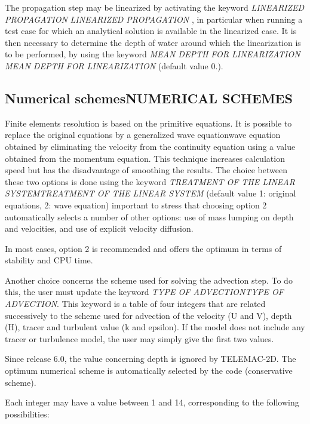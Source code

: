 \documentclass{article} %
\begin{document}
 The propagation step may be linearized by activating the keyword \textit{LINEARIZED PROPAGATION} \textit{LINEARIZED PROPAGATION }, in particular when running a test case for which an analytical solution is available in the linearized case. It is then necessary to determine the depth of water around which the linearization is to be performed, by using the keyword \textit{MEAN DEPTH FOR LINEARIZATION} \textit{MEAN DEPTH FOR LINEARIZATION} (default value 0.).


\subsection{ Numerical schemesNUMERICAL SCHEMES}

 Finite elements resolution is based on the primitive equations. It is possible to replace the original equations by a generalized wave equationwave equation obtained by eliminating the velocity from the continuity equation using a value obtained from the momentum equation. This technique increases calculation speed but has the disadvantage of smoothing the results. The choice between these two options is done using the keyword \textit{TREATMENT OF THE LINEAR SYSTEMTREATMENT OF THE LINEAR SYSTEM} (default value 1: original equations, 2: wave equation) important to stress that choosing option 2 automatically selects a number of other options: use of mass lumping on depth and velocities, and use of explicit velocity diffusion.

 In most cases, option 2 is recommended and offers the optimum in terms of stability and CPU time.

 Another choice concerns the scheme used for solving the advection step. To do this, the user must update the keyword \textit{TYPE OF ADVECTIONTYPE OF ADVECTION}. This keyword is a table of four integers that are related successively to the scheme used for advection of the velocity (U and V), depth (H), tracer and turbulent value (k and epsilon). If the model does not include any tracer or turbulence model, the user may simply give the first two values.

 Since release 6.0, the value concerning depth is ignored by TELEMAC-2D. The optimum numerical scheme is automatically selected by the code (conservative scheme).

 Each integer may have a value between 1 and 14, corresponding to the following possibilities:
\end{document}
